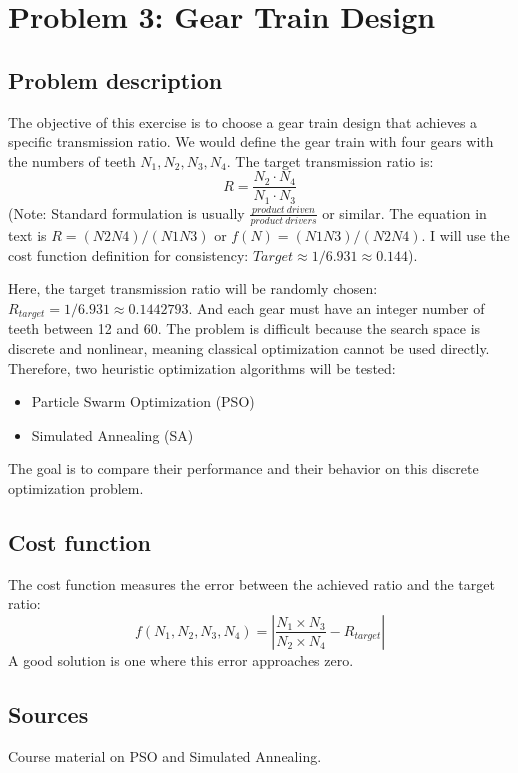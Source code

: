 \section{Problem 3: Gear Train Design}

\subsection{Problem description}
The objective of this exercise is to choose a gear train design that achieves a specific transmission ratio.
We would define the gear train with four gears with the numbers of teeth $N_1, N_2, N_3, N_4$.
The target transmission ratio is:
\begin{equation}
R = \frac{N_2 \cdot N_4}{N_1 \cdot N_3}
\end{equation}
(Note: Standard formulation is usually $\frac{product\ driven}{product\ drivers}$ or similar. The equation in text is $R=(N2 N4)/(N1 N3)$ or $f(N) = (N1 N3)/(N2 N4)$. I will use the cost function definition for consistency: $Target \approx 1/6.931 \approx 0.144$).

Here, the target transmission ratio will be randomly chosen: $R_{target} = 1/6.931 \approx 0.1442793$.
And each gear must have an integer number of teeth between 12 and 60.
The problem is difficult because the search space is discrete and nonlinear, meaning classical optimization cannot be used directly.
Therefore, two heuristic optimization algorithms will be tested:
\begin{itemize}
    \item Particle Swarm Optimization (PSO)
    \item Simulated Annealing (SA)
\end{itemize}
The goal is to compare their performance and their behavior on this discrete optimization problem.

\subsection{Cost function}
The cost function measures the error between the achieved ratio and the target ratio:
\begin{equation}
f(N_1,N_2,N_3,N_4) = \left| \frac{N_1 \times N_3}{N_2 \times N_4} - R_{target} \right|
\end{equation}
A good solution is one where this error approaches zero.

\subsection{Sources}
Course material on PSO and Simulated Annealing.

